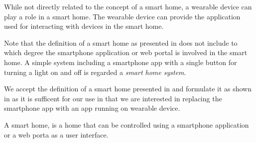 While not directly related to the concept of a smart home, a wearable device can play a role in a smart home. The wearable device can provide the application used for interacting with devices in the smart home.

Note that the definition of a smart home as presented in \cite{SMARTHOMETREND} does not include to which degree the smartphone application or web portal is involved in the smart home. A simple system including a smartphone app with a single button for turning a light on and off is regarded a \emph{smart home system}.

We accept the definition of a smart home presented in \cite{SMARTHOMETREND} and formulate it as shown in  as it is sufficent for our use in that we are interested in replacing the smartphone app with an app running on wearable device.

\begin{definition}
\label{def:smarthome}
A smart home, is a home that can be controlled using a smartphone application or a web porta as a user interface.
\end{definition}

